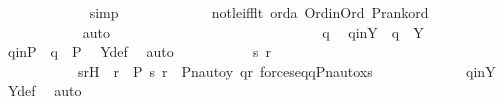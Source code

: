\begin{isabellebody}
\ \ \ \ \ \ \ \ \ \ \ \isamarkupfalse%
\ simp\ \isanewline
\ \ \ \ \ \ \ \ \ \ \isamarkupfalse%
\ not{\isacharunderscore}{\kern0pt}le{\isacharunderscore}{\kern0pt}iff{\isacharunderscore}{\kern0pt}lt\ orda\ Ord{\isacharunderscore}{\kern0pt}in{\isacharunderscore}{\kern0pt}Ord\ P{\isacharunderscore}{\kern0pt}rank{\isacharunderscore}{\kern0pt}ord\ \isanewline
\ \ \ \ \ \ \ \ \ \ \isamarkupfalse%
\ auto\ \isanewline
\ \ \ \ \ \ \ \ \ \ \isamarkupfalse%
\isanewline
\ \ \ \ \ \ \isamarkupfalse%
\ \isanewline
\ \ \ \ \ \ \ \ \isamarkupfalse%
\ q{\isacharprime}{\kern0pt}\ \isamarkupfalse%
\ qinY\ {\isacharcolon}{\kern0pt}\ {\isachardoublequoteopen}q{\isacharprime}{\kern0pt}\ {\isasymin}\ Y{\isachardoublequoteclose}\ \isanewline
\ \ \ \ \ \ \ \ \isamarkupfalse%
\ \isamarkupfalse%
\ q{\isacharprime}{\kern0pt}inP\ {\isacharcolon}{\kern0pt}\ {\isachardoublequoteopen}q{\isacharprime}{\kern0pt}\ {\isasymin}\ P{\isachardoublequoteclose}\ \isamarkupfalse%
\ Y{\isacharunderscore}{\kern0pt}def\ \isamarkupfalse%
\ auto\ \isanewline
\ \ \ \ \ \ \ \ \isamarkupfalse%
\ s{\isacharprime}{\kern0pt}\ r{\isacharprime}{\kern0pt}\ \isanewline
\ \ \ \ \ \ \ \ \ \ \ s{\isacharprime}{\kern0pt}r{\isacharprime}{\kern0pt}H\ {\isacharcolon}{\kern0pt}\ {\isachardoublequoteopen}r{\isacharprime}{\kern0pt}\ {\isasymin}\ P{\isachardoublequoteclose}\ {\isachardoublequoteopen}{\isacharless}{\kern0pt}s{\isacharprime}{\kern0pt}{\isacharcomma}{\kern0pt}\ r{\isacharprime}{\kern0pt}{\isachargreater}{\kern0pt}\ {\isasymin}\ Pn{\isacharunderscore}{\kern0pt}auto{\isacharparenleft}{\kern0pt}{\isasympi}{\isacharparenright}{\kern0pt}{\isacharbackquote}{\kern0pt}y{\isachardoublequoteclose}\ {\isachardoublequoteopen}q{\isacharprime}{\kern0pt}{\isasympreceq}r{\isacharprime}{\kern0pt}{\isachardoublequoteclose}\ {\isachardoublequoteopen}forces{\isacharunderscore}{\kern0pt}eq{\isacharparenleft}{\kern0pt}q{\isacharprime}{\kern0pt}{\isacharcomma}{\kern0pt}Pn{\isacharunderscore}{\kern0pt}auto{\isacharparenleft}{\kern0pt}{\isasympi}{\isacharparenright}{\kern0pt}{\isacharbackquote}{\kern0pt}x{\isacharcomma}{\kern0pt}s{\isacharprime}{\kern0pt}{\isacharparenright}{\kern0pt}{\isachardoublequoteclose}\ \isanewline
\ \ \ \ \ \ \ \ \ \ \isamarkupfalse%
\ qinY\ \isamarkupfalse%
\ Y{\isacharunderscore}{\kern0pt}def\ \isamarkupfalse%
\ auto\ \isanewline

\end{isabellebody}
